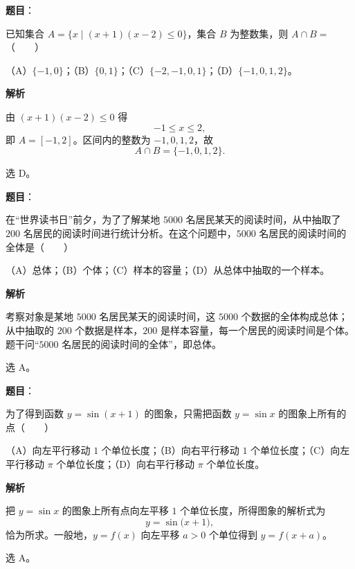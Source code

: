 

\begin{answer}

\textbf{题目}：

已知集合 $A=\{x\mid (x+1)(x-2)\leqslant 0\}$，集合 $B$ 为整数集，则 $A\cap B=$\mbox{（　　）}

（A）$\{-1,0\}$；（B）$\{0,1\}$；（C）$\{-2,-1,0,1\}$；（D）$\{-1,0,1,2\}$。

\textbf{解析}

由 $(x+1)(x-2)\leqslant 0$ 得
\nopagebreak[4]
\[-1\leqslant x\leqslant 2,\]
即 $A=[-1,2]$。区间内的整数为 $-1,0,1,2$，故
\nopagebreak[4]
\[A\cap B=\{-1,0,1,2\}.\]

选 D。


\end{answer}
\begin{answer}

\textbf{题目}：

在“世界读书日”前夕，为了了解某地 $5000$ 名居民某天的阅读时间，从中抽取了 $200$ 名居民的阅读时间进行统计分析。在这个问题中，$5000$ 名居民的阅读时间的全体是\mbox{（　　）}

（A）总体；（B）个体；（C）样本的容量；（D）从总体中抽取的一个样本。

\textbf{解析}

考察对象是某地 $5000$ 名居民某天的阅读时间，这 $5000$ 个数据的全体构成总体；从中抽取的 $200$ 个数据是样本，$200$ 是样本容量，每一个居民的阅读时间是个体。题干问“$5000$ 名居民的阅读时间的全体”，即总体。

选 A。


\end{answer}
\begin{answer}

\textbf{题目}：

为了得到函数 $y=\sin(x+1)$ 的图象，只需把函数 $y=\sin x$ 的图象上所有的点\mbox{（　　）}

（A）向左平行移动 $1$ 个单位长度；（B）向右平行移动 $1$ 个单位长度；（C）向左平行移动 $\pi$ 个单位长度；（D）向右平行移动 $\pi$ 个单位长度。

\textbf{解析}

把 $y=\sin x$ 的图象上所有点向左平移 $1$ 个单位长度，所得图象的解析式为
\nopagebreak[4]
\[y=\sin\bigl(x+1\bigr),\]
恰为所求。一般地，$y=f(x)$ 向左平移 $a>0$ 个单位得到 $y=f(x+a)$。

选 A。


\end{answer}
